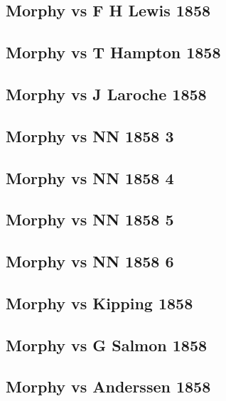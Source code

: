 \documentclass[]{book}
\begin{document}
\subsection{Morphy vs F H Lewis 1858}\label{morphy-vs-f-h-lewis-1858}

\subsection{Morphy vs T Hampton 1858}\label{morphy-vs-t-hampton-1858}

\subsection{Morphy vs J Laroche 1858}\label{morphy-vs-j-laroche-1858}

\subsection{Morphy vs NN 1858 3}\label{morphy-vs-nn-1858-3}

\subsection{Morphy vs NN 1858 4}\label{morphy-vs-nn-1858-4}

\subsection{Morphy vs NN 1858 5}\label{morphy-vs-nn-1858-5}

\subsection{Morphy vs NN 1858 6}\label{morphy-vs-nn-1858-6}

\subsection{Morphy vs Kipping 1858}\label{morphy-vs-kipping-1858}

\subsection{Morphy vs G Salmon 1858}\label{morphy-vs-g-salmon-1858}

\subsection{Morphy vs Anderssen 1858}\label{morphy-vs-anderssen-1858}
\end{document}

